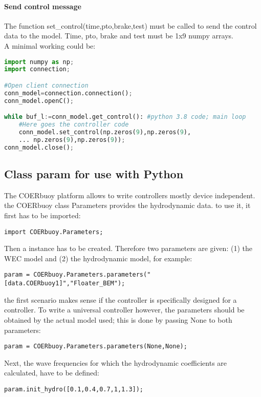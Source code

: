 \documentclass[oneside,10pt,a4paper]{book}
\begin{document}
\paragraph{Send control message}
The function set\_control(time,pto,brake,test) must be called to send the control data to the model. Time, pto, brake and test must be 1x9 numpy arrays.\\
A minimal working could be:
\begin{lstlisting}[language=Python]
import numpy as np;
import connection;

#Open client connection
conn_model=connection.connection();
conn_model.openC();

while buf_l:=conn_model.get_control(): #python 3.8 code; main loop
    #Here goes the controller code
    conn_model.set_control(np.zeros(9),np.zeros(9),
    ... np.zeros(9),np.zeros(9));
conn_model.close();
\end{lstlisting}
\subsection{Class param for use with Python}
The COERbuoy platform allows to write controllers mostly device independent. the COERbuoy class Parameters provides the hydrodynamic data. to use it, it first has to be imported:
\begin{verbatim}
import COERbuoy.Parameters;
\end{verbatim}
Then a instance has to be created. Therefore two parameters are given: (1) the WEC model and (2) the hydrodynamic model, for example:
\begin{verbatim}
param = COERbuoy.Parameters.parameters("[data.COERbuoy1]","Floater_BEM");
\end{verbatim}
the first scenario makes sense if the controller is specifically designed for a controller. To write a universal controller however, the parameters should be obtained by the actual model used; this is done by passing None to both parameters:
\begin{verbatim}
param = COERbuoy.Parameters.parameters(None,None);
\end{verbatim}
Next, the wave frequencies for which the hydrodynamic coefficients are calculated, have to be defined:
\begin{verbatim}
param.init_hydro([0.1,0.4,0.7,1,1.3]);
\end{verbatim}
\end{document}
